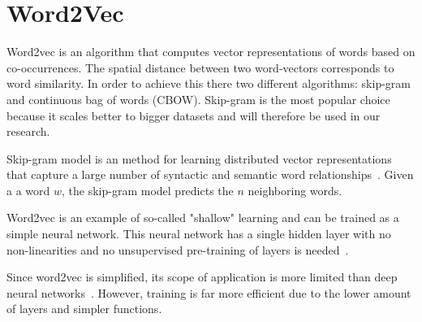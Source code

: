 \section{Word2Vec}
\label{sec:word2vec}
Word2vec is an algorithm that computes vector representations of words based on co-occurrences. The spatial distance between two word-vectors corresponds to word similarity. In order to achieve this there two different algorithms: skip-gram and continuous bag of words (CBOW). Skip-gram is the most popular choice because it scales better to bigger datasets and will therefore be used in our research.

Skip-gram model is an method for learning distributed vector representations that capture a large number of syntactic and semantic word relationships~\cite{mikolov2013distributed}. Given a a word $w$, the skip-gram model predicts the $n$ neighboring words.

Word2vec is an example of so-called "shallow" learning and can be trained as a simple neural network. This neural network has a single hidden layer with no non-linearities and no unsupervised pre-training of layers is needed~\cite{wang2014introduction}.

Since word2vec is simplified, its scope of application is more limited than deep neural networks~\cite{bengio2007scaling}. However, training is far more efficient due to the lower amount of layers and simpler functions.